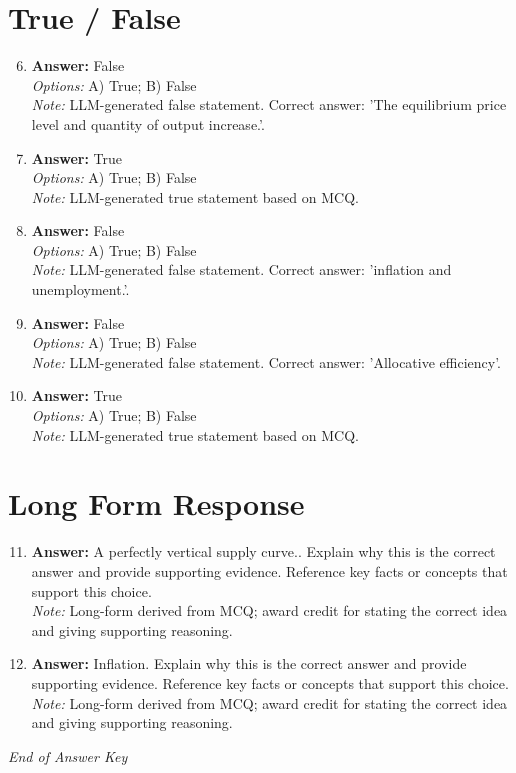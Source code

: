 \documentclass[12pt]{article}
\begin{document}
\section*{True / False}
\begin{enumerate}[label=\arabic*.]
\setcounter{enumi}{5}
\item \textbf{Answer:} False
\\ \textit{Options:} A) True; B) False
\\ \textit{Note:} LLM-generated false statement. Correct answer: 'The equilibrium price level and quantity of output increase.'.
\item \textbf{Answer:} True
\\ \textit{Options:} A) True; B) False
\\ \textit{Note:} LLM-generated true statement based on MCQ.
\item \textbf{Answer:} False
\\ \textit{Options:} A) True; B) False
\\ \textit{Note:} LLM-generated false statement. Correct answer: 'inflation and unemployment.'.
\item \textbf{Answer:} False
\\ \textit{Options:} A) True; B) False
\\ \textit{Note:} LLM-generated false statement. Correct answer: 'Allocative efficiency'.
\item \textbf{Answer:} True
\\ \textit{Options:} A) True; B) False
\\ \textit{Note:} LLM-generated true statement based on MCQ.
\end{enumerate}

\section*{Long Form Response}
\begin{enumerate}[label=\arabic*.]
\setcounter{enumi}{10}
\item \textbf{Answer:} A perfectly vertical supply curve.. Explain why this is the correct answer and provide supporting evidence. Reference key facts or concepts that support this choice.
\\ \textit{Note:} Long-form derived from MCQ; award credit for stating the correct idea and giving supporting reasoning.
\item \textbf{Answer:} Inflation. Explain why this is the correct answer and provide supporting evidence. Reference key facts or concepts that support this choice.
\\ \textit{Note:} Long-form derived from MCQ; award credit for stating the correct idea and giving supporting reasoning.
\end{enumerate}

\vfill
\noindent\textit{End of Answer Key}
\end{document}
